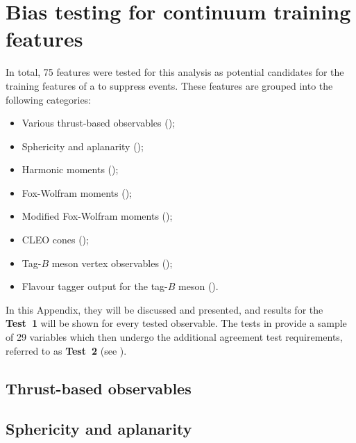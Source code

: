 \chapter{Bias testing for continuum \texorpdfstring{\BDT}{BDT} training features}\label{sec:appendix_continuum_features}

In total, 75 features were tested for this analysis as potential candidates for the training features of a \BDT to suppress \epem\ra\qqbar events.
These features are grouped into the following categories:

\begin{itemize}
    \item Various thrust-based observables ();
    \item Sphericity and aplanarity ();
    \item Harmonic moments ();
    \item Fox-Wolfram moments ();
    \item Modified Fox-Wolfram moments ();
    \item CLEO cones ();
    \item Tag-$B$ meson vertex observables ();
    \item Flavour tagger output for the tag-$B$ meson ().
\end{itemize}

In this Appendix, they will be discussed and presented, and results for the \textbf{Test~1} will be shown for every tested observable.
The tests in 
provide a sample of 29 variables which then undergo the additional agreement test requirements, referred to as \textbf{Test~2} (see ).

\section{Thrust-based observables}\label{sec:thrusts}

\newpage

\section{Sphericity and aplanarity}\label{sec:sphericity_aplanarity}

\newpage

